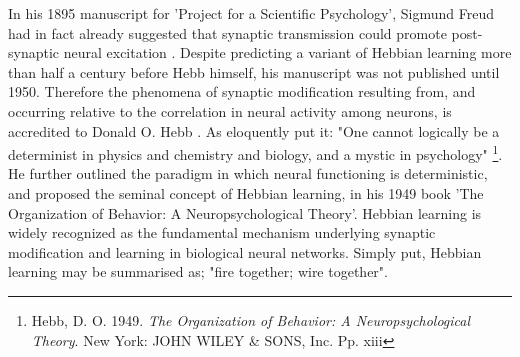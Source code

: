 In his 1895 manuscript for 'Project for a Scientific Psychology', Sigmund Freud had in fact already suggested that synaptic transmission could promote post-synaptic neural excitation \citep{Kiernan2011}. Despite predicting a variant of Hebbian learning more than half a century before Hebb himself, his manuscript was not published until 1950. Therefore the phenomena of synaptic modification resulting from, and occurring relative to the correlation in neural activity among neurons, is accredited to Donald O. Hebb \citep{Kiernan2011}.
As \cite{Hebb1949} eloquently put it: "One cannot logically be a determinist in physics and chemistry and biology, and a mystic in psychology"
\footnote{Hebb, D. O. 1949. \textit{The Organization of Behavior: A Neuropsychological Theory}. New York: JOHN WILEY \& SONS, Inc. Pp. xiii}.
He further outlined the paradigm in which neural functioning is deterministic, and proposed the seminal concept of Hebbian learning, in his 1949 book 'The Organization of Behavior: A Neuropsychological Theory'. Hebbian learning is widely recognized as the fundamental mechanism underlying synaptic modification and learning in biological neural networks. Simply put, Hebbian learning may be summarised as; "fire together; wire together".

